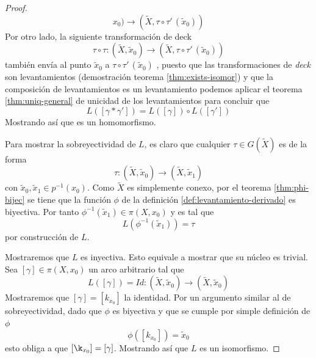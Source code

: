 \begin{proof}
\[    x _0) \to (\tilde X , \tau \circ \tau' \, (\tilde x_0)) \]
  Por otro lado, la siguiente transformación de deck
  \[ \tau \circ \tau : (\tilde X, \tilde x _0) \to (\tilde X , \tau
    \circ \tau' \, (\tilde x_0))
  \]
  también envía al punto \(\tilde x_0\) a \(\tau \circ \tau' \, (\tilde
  x_0)\) , puesto que las transformaciones de \emph{deck} son
  levantamientos (demostración teorema \ref{thm:exists-isomor}) y que la
  composición de levantamientos es un levantamiento podemos aplicar el
  teorema \ref{thm:uniq-general} de unicidad de los levantamientos para
  concluir que
  \[ L \left( [\gamma * \gamma'] \right) = L \left( [\gamma] \right)
    \circ L \left( [\gamma'] \right)\]
  Mostrando así que es un homomorfismo.

  Para mostrar la sobreyectividad de \(L\), es claro que cualquier
  \(\tau \in G (\tilde X)\) es de la forma
  \[ \tau : (\tilde X, \tilde x_0) \to (\tilde X, \tilde x_1) \]
  con \(\tilde x_0, \tilde x_1 \in p^{-1} (x_0)\). Como \(\tilde X\) es
  simplemente conexo, por el teorema \ref{thm:phi-bijec} se tiene que la
  función \(\phi\) de la definición \ref{def:levantamiento-derivado} es
  biyectiva. Por tanto \(\phi^{-1} (\tilde x_1) \in \pi (X, x_0)\) y es
  tal que
  \[ L \left( \phi^{-1} (\tilde x_1) \right) = \tau \]
  por construcción de \(L\).

  Mostraremos que \(L\) es inyectiva. Esto equivale a mostrar que su
  núcleo es trivial. Sea \([\gamma] \in \pi (X , x_0)\) un arco
  arbitrario tal que
  \[ L \left( [\gamma] \right) = Id : (\tilde X , \tilde x_0) \to
    (\tilde X, \tilde x_0) \]
  Mostraremos que \([\gamma] = [k_{x_0}]\) la identidad. Por un
  argumento similar al de sobreyectividad, dado que \(\phi\) es
  biyectiva y que se cumple por simple definición de \(\phi\)
  \[ \phi \left( [k_{x_0}] \right) = \tilde x _0 \]
  esto obliga a que \([\k_{x_0}] = [\gamma]\). Mostrando así que \(L\)
  es un isomorfismo.
\end{proof}

